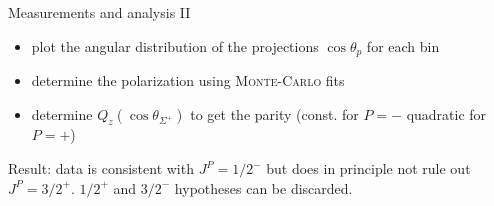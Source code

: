 \documentclass[11pt,aspectratio=1610,dvipsnames]{beamer}
\begin{document}
\begin{frame}{Measurements and analysis II}
		\begin{tcolorbox}[colback=black!10,colframe=gray!20!black,title=Analysis procedure] 
		\begin{itemize}
			\item plot the angular distribution of the projections  $\cos\theta_p$ for each bin
			\item determine the polarization using \textsc{Monte-Carlo} fits
			\item determine $Q_z(\cos\theta_{\Sigma^+})$ to get the parity (const. for $P=-$ quadratic for $P=+$)
		\end{itemize}
	\end{tcolorbox}	
Result: data is consistent with $J^P=1/2^-$ but does in principle not rule out $J^P=3/2^+$. $1/2^+$ and $3/2^-$ hypotheses can be discarded.
\end{frame}
\end{document}
